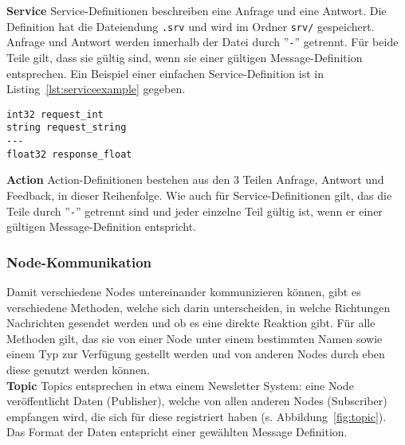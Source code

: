 \textbf{Service} Service-Definitionen beschreiben eine Anfrage und eine Antwort.
Die Definition hat die Dateiendung \verb|.srv| und wird im Ordner \verb|srv/| gespeichert.
Anfrage und Antwort werden innerhalb der Datei durch ''\verb|-|'' getrennt.
Für beide Teile gilt, dass sie gültig sind, wenn sie einer gültigen Message-Definition entsprechen.
Ein Beispiel einer einfachen Service-Definition ist in Listing~\ref{lst:serviceexample} gegeben.\\
\begin{minipage}{\linewidth}%
\begin{lstlisting}[caption={Beispiel einer Service Definition}, label={lst:serviceexample}]
int32 request_int
string request_string
---
float32 response_float
\end{lstlisting}
\end{minipage}

\textbf{Action} Action-Definitionen bestehen aus den 3 Teilen Anfrage, Antwort und Feedback, in dieser Reihenfolge.
Wie auch für Service-Definitionen gilt, das die Teile durch ''\verb|-|'' getrennt sind und jeder einzelne Teil gültig ist, wenn er einer gültigen Message-Definition entspricht.

\subsubsection{Node-Kommunikation}{\label{rosnodecomm}}
Damit verschiedene Nodes untereinander kommunizieren können, gibt es verschiedene Methoden, welche sich darin unterscheiden, in welche Richtungen Nachrichten gesendet werden und ob es eine direkte Reaktion gibt.
Für alle Methoden gilt, das sie von einer Node unter einem bestimmten Namen sowie einem Typ zur Verfügung gestellt werden und von anderen Nodes durch eben diese genutzt werden können.\\

\textbf{Topic} Topics entsprechen in etwa einem Newsletter System: eine Node veröffentlicht Daten (Publisher), welche von allen anderen Nodes (Subscriber) empfangen wird, die sich für diese registriert haben (s. Abbildung~\ref{fig:topic}).
Das Format der Daten entspricht einer gewählten Message Definition.\\

